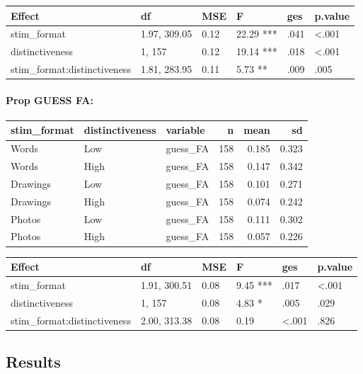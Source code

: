 \documentclass[
  11pt,
]{article}
\begin{document}
\begin{tabular}{l|l|l|l|l|l}
\hline
Effect & df & MSE & F & ges & p.value\\
\hline
stim\_format & 1.97, 309.05 & 0.12 & 22.29 *** & .041 & <.001\\
\hline
distinctiveness & 1, 157 & 0.12 & 19.14 *** & .018 & <.001\\
\hline
stim\_format:distinctiveness & 1.81, 283.95 & 0.11 & 5.73 ** & .009 & .005\\
\hline
\end{tabular}

\newpage

\hypertarget{prop-guess-fa}{%
\paragraph{Prop GUESS FA:}\label{prop-guess-fa}}

\begin{table}[!h]
\centering
\begin{tabular}{lllrrr}
\toprule
stim\_format & distinctiveness & variable & n & mean & sd\\
\midrule
Words & Low & guess\_FA & 158 & 0.185 & 0.323\\
Words & High & guess\_FA & 158 & 0.147 & 0.342\\
Drawings & Low & guess\_FA & 158 & 0.101 & 0.271\\
Drawings & High & guess\_FA & 158 & 0.074 & 0.242\\
Photos & Low & guess\_FA & 158 & 0.111 & 0.302\\
\addlinespace
Photos & High & guess\_FA & 158 & 0.057 & 0.226\\
\bottomrule
\end{tabular}
\end{table}

\begin{tabular}{l|l|l|l|l|l}
\hline
Effect & df & MSE & F & ges & p.value\\
\hline
stim\_format & 1.91, 300.51 & 0.08 & 9.45 *** & .017 & <.001\\
\hline
distinctiveness & 1, 157 & 0.08 & 4.83 * & .005 & .029\\
\hline
stim\_format:distinctiveness & 2.00, 313.38 & 0.08 & 0.19 & <.001 & .826\\
\hline
\end{tabular}

\newpage

\hypertarget{results-5}{%
\subsection{Results}\label{results-5}}
\end{document}
